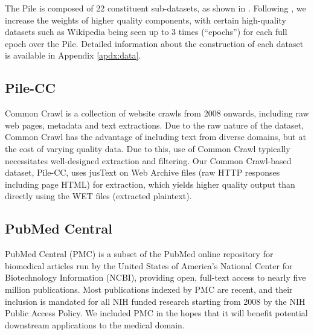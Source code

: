\documentclass[11pt,a4paper]{article}
\begin{document}
\begin{table*}[ht]
\begin{tabular}{l r r r r r}
    \end{tabular}
\caption{Overview of datasets in the Pile before creating the held out sets. Raw Size is the size before any up- or down-sampling. Weight is the percentage of bytes in the final dataset occupied by each dataset. Epochs is the number of passes over each constituent dataset during a full epoch over the Pile. Effective Size is the approximate number of bytes in the Pile occupied by each dataset. Datasets marked with a \textdagger\ are used with minimal preprocessing from prior work.} %
\label{table:pile_overview}
\end{table*}

The Pile is composed of 22 constituent sub-datasets, as shown in . 
Following \citet{GPT3}, we increase the weights of higher quality components, with certain high-quality datasets such as Wikipedia being seen up to 3 times (``epochs'') for each full epoch over the Pile.
Detailed information about the construction of each dataset is available in Appendix \ref{apdx:data}.

\subsection{Pile-CC}

Common Crawl is a collection of website crawls from 2008 onwards, including raw web pages, metadata and text extractions. Due to the raw nature of the dataset, Common Crawl has the advantage of including text from diverse domains, but at the cost of varying quality data. Due to this, use of Common Crawl typically necessitates well-designed extraction and filtering. Our Common Crawl-based dataset, Pile-CC, uses jusText \citep{justext} on Web Archive files (raw HTTP responses including page HTML) for extraction, which yields higher quality output than directly using the WET files (extracted plaintext). 

\subsection{PubMed Central}\label{subsection:pmc}

PubMed Central (PMC) is a subset of the PubMed online repository for biomedical articles run by the United States of America's National Center for Biotechnology Information (NCBI), providing open, full-text access to nearly five million publications. Most publications indexed by PMC are recent, and their inclusion is mandated for all NIH funded research starting from 2008 by the NIH Public Access Policy. We included PMC in the hopes that it will benefit potential downstream applications to the medical domain.
\end{document}
